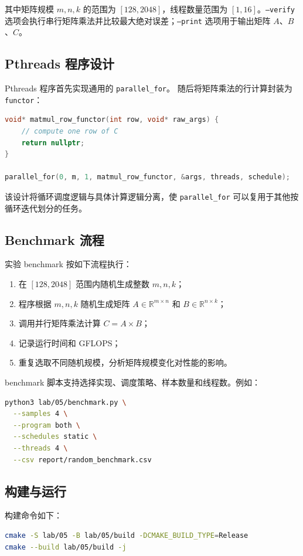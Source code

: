 \documentclass[12pt,a4paper]{ctexart}
\begin{document}
其中矩阵规模 $m,n,k$ 的范围为 $[128,2048]$，线程数量范围为 $[1,16]$。\texttt{--verify} 选项会执行串行矩阵乘法并比较最大绝对误差；\texttt{--print} 选项用于输出矩阵 $A$、$B$、$C$。

\subsection*{Pthreads 程序设计}
Pthreads 程序首先实现通用的 \texttt{parallel\_for}。
随后将矩阵乘法的行计算封装为 \texttt{functor}：
\begin{lstlisting}[language=C++]
void* matmul_row_functor(int row, void* raw_args) {
    // compute one row of C
    return nullptr;
}

parallel_for(0, m, 1, matmul_row_functor, &args, threads, schedule);
\end{lstlisting}

该设计将循环调度逻辑与具体计算逻辑分离，使 \texttt{parallel\_for} 可以复用于其他按循环迭代划分的任务。

\subsection*{Benchmark 流程}
实验 benchmark 按如下流程执行：
\begin{enumerate}[itemsep=0.3em]
  \item 在 $[128,2048]$ 范围内随机生成整数 $m,n,k$；
  \item 程序根据 $m,n,k$ 随机生成矩阵 $A\in\mathbb{R}^{m\times n}$ 和 $B\in\mathbb{R}^{n\times k}$；
  \item 调用并行矩阵乘法计算 $C=A\times B$；
  \item 记录运行时间和 GFLOPS；
  \item 重复选取不同随机规模，分析矩阵规模变化对性能的影响。
\end{enumerate}

benchmark 脚本支持选择实现、调度策略、样本数量和线程数。例如：
\begin{lstlisting}[language=bash]
python3 lab/05/benchmark.py \
  --samples 4 \
  --program both \
  --schedules static \
  --threads 4 \
  --csv report/random_benchmark.csv
\end{lstlisting}

\subsection*{构建与运行}
构建命令如下：
\begin{lstlisting}[language=bash]
cmake -S lab/05 -B lab/05/build -DCMAKE_BUILD_TYPE=Release
cmake --build lab/05/build -j
\end{lstlisting}
\end{document}
